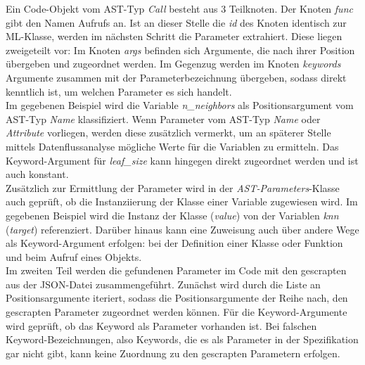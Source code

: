 \documentclass[german,bachelor]{swsLeipzig}
\begin{document}
Ein Code-Objekt vom AST-Typ \textit{Call} besteht aus 3 Teilknoten.
Der Knoten \textit{func} gibt den Namen Aufrufs an.
Ist an dieser Stelle die \textit{id} des Knoten identisch zur ML-Klasse, werden im nächsten Schritt die Parameter
extrahiert.
Diese liegen zweigeteilt vor:
Im Knoten \textit{args} befinden sich Argumente, die nach ihrer Position übergeben und zugeordnet werden.
Im Gegenzug werden im Knoten \textit{keywords} Argumente zusammen mit der Parameterbezeichnung übergeben, sodass direkt kenntlich
ist, um welchen Parameter es sich handelt. \\

Im gegebenen Beispiel wird die Variable \textit{n\_neighbors} als Positionsargument vom AST-Typ \textit{Name} klassifiziert.
Wenn Parameter vom AST-Typ \textit{Name} oder \textit{Attribute} vorliegen, werden diese zusätzlich vermerkt, um an späterer Stelle mittels
Datenflussanalyse mögliche Werte für die Variablen zu ermitteln.
Das Keyword-Argument für \textit{leaf\_size} kann hingegen direkt zugeordnet werden und ist auch konstant. \\

Zusätzlich zur Ermittlung der Parameter wird in der \textit{AST-Parameters}-Klasse auch geprüft, ob die Instanziierung der Klasse
einer Variable zugewiesen wird.
Im gegebenen Beispiel wird die Instanz der Klasse (\textit{value}) von der Variablen \textit{knn} (\textit{target}) referenziert.
Darüber hinaus kann eine Zuweisung auch über andere Wege als Keyword-Argument erfolgen:
bei der Definition einer Klasse oder Funktion und beim Aufruf eines Objekts.\\

Im zweiten Teil werden die gefundenen Parameter im Code mit den gescrapten aus der JSON-Datei zusammengeführt.
Zunächst wird durch die Liste an Positionsargumente iteriert, sodass die Positionsargumente der Reihe nach,
den gescrapten Parameter zugeordnet werden können.
Für die Keyword-Argumente wird geprüft, ob das Keyword als Parameter vorhanden ist.
Bei falschen Keyword-Bezeichnungen, also Keywords, die es als Parameter in der Spezifikation gar nicht gibt,
kann keine Zuordnung zu den gescrapten Parametern erfolgen. \\
\end{document}

